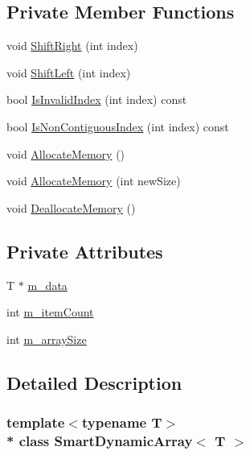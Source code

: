 \subsection*{Private Member Functions}
\begin{DoxyCompactItemize}
\item 
void \hyperlink{classSmartDynamicArray_ac2a448df0eff2b98f92715d8eed2870b}{Shift\+Right} (int index)
\item 
void \hyperlink{classSmartDynamicArray_a40c441e0e56ed5a738ff78d9f8847e43}{Shift\+Left} (int index)
\item 
bool \hyperlink{classSmartDynamicArray_ab08071c6bafb56671a42b37491ede24b}{Is\+Invalid\+Index} (int index) const 
\item 
bool \hyperlink{classSmartDynamicArray_af2c9ea098a97459f6ca355beddebf5a3}{Is\+Non\+Contiguous\+Index} (int index) const 
\item 
void \hyperlink{classSmartDynamicArray_ab13fbc825bbeef7f5157ab4daf379a85}{Allocate\+Memory} ()
\item 
void \hyperlink{classSmartDynamicArray_ae774f7bdf97aac3accdb8ea2d035b9f5}{Allocate\+Memory} (int new\+Size)
\item 
void \hyperlink{classSmartDynamicArray_abdedcf773e4fe2fed4e3bcb40fa93914}{Deallocate\+Memory} ()
\end{DoxyCompactItemize}
\subsection*{Private Attributes}
\begin{DoxyCompactItemize}
\item 
T $\ast$ \hyperlink{classSmartDynamicArray_a5c85d1791982c4366cd7f01b973aadb4}{m\+\_\+data}
\item 
int \hyperlink{classSmartDynamicArray_a132e6ffa1678a3ef2eafad1195df82e4}{m\+\_\+item\+Count}
\item 
int \hyperlink{classSmartDynamicArray_a57e2d12b656b0aa81f21a8a805f3acf1}{m\+\_\+array\+Size}
\end{DoxyCompactItemize}


\subsection{Detailed Description}
\subsubsection*{template$<$typename T$>$\\*
class Smart\+Dynamic\+Array$<$ T $>$}



